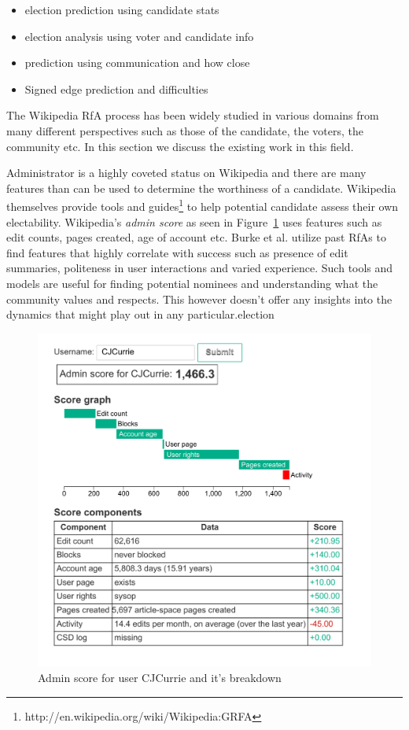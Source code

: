 \begin{itemize}
    \item election prediction using candidate stats
    \item election analysis using voter and candidate info
    \item prediction using communication and how close 
    \item Signed edge prediction and difficulties
\end{itemize}

The Wikipedia RfA process has been widely studied in various domains from many different perspectives such as those of the candidate, the voters, the community etc. In this section we discuss the existing work in this field.
\smallskip

Administrator is a highly coveted status on Wikipedia and there are many features than can be used to determine the worthiness of a candidate. Wikipedia themselves provide tools and guides\footnote{http://en.wikipedia.org/wiki/Wikipedia:GRFA} to help potential candidate assess their own electability. Wikipedia's \textit{admin score} as seen in Figure~\ref{fig:admin-score} uses features such as edit counts, pages created, age of account etc. Burke et al. \cite{BurkeMoppingUp} utilize past RfAs to find features that highly correlate with success such as presence of edit summaries, politeness in user interactions and varied experience. Such tools and models are useful for finding potential nominees and understanding what the community values and respects. This however doesn't offer any insights into the dynamics that might play out in any particular.election
\begin{figure}[h!]
    \centering
    \includegraphics[width=\linewidth]{images/Asynchronous Admin Score.pdf}
    \caption{Admin score for user CJCurrie and it's breakdown}
    \label{fig:admin-score}
\end{figure}
\smallskip

